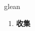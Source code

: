 
\begin{frame}
{\huge glean}
\begin{center}
\begin{enumerate}\Large
  \item \textbf{收集}
\end{enumerate}
\end{center}
\end{frame}
